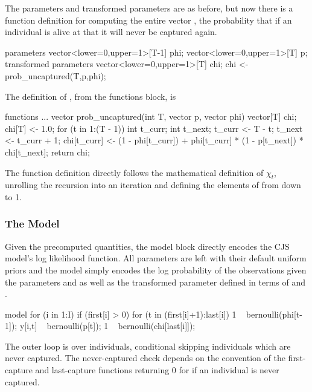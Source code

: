The parameters and transformed parameters are as before, but now there
is a function definition for computing the entire vector , the
probability that if an individual is alive at  that it will
never be captured again.
%
\begin{stancode}
parameters {
  vector<lower=0,upper=1>[T-1] phi;
  vector<lower=0,upper=1>[T] p;
}
transformed parameters {
  vector<lower=0,upper=1>[T] chi;
  chi <- prob_uncaptured(T,p,phi);
}
\end{stancode}
%
The definition of , from the functions block,
is
%
\begin{stancode}
functions {
  ...
  vector prob_uncaptured(int T, vector p, vector phi) {
    vector[T] chi;
    chi[T] <- 1.0;              
    for (t in 1:(T - 1)) {
      int t_curr;
      int t_next;
      t_curr <- T - t;
      t_next <- t_curr + 1;
      chi[t_curr] <- (1 - phi[t_curr]) 
                     + phi[t_curr] 
                       * (1 - p[t_next]) 
                       * chi[t_next]; 
    }
    return chi;
  }
}
\end{stancode}
%
The function definition directly follows the mathematical definition
of $\chi_t$, unrolling the recursion into an iteration and
defining the elements of  from  down to 1.

\subsubsection{The Model}

Given the precomputed quantities, the model block directly encodes the
CJS model's log likelihood function.  All parameters are left with
their default uniform priors and the model simply encodes the log
probability of the observations  given the parameters 
and  as well as the transformed parameter  defined
in terms of  and .
%
\begin{stancode}
model {
  for (i in 1:I) {
    if (first[i] > 0) {
      for (t in (first[i]+1):last[i]) {
        1 ~ bernoulli(phi[t-1]);
        y[i,t] ~ bernoulli(p[t]);
      }
      1 ~ bernoulli(chi[last[i]]);
    }
  }
}
\end{stancode}
%
The outer loop is over individuals, conditional skipping individuals
 which are never captured.  The never-captured check depends
on the convention of the first-capture and last-capture functions
returning 0 for  if an individual is never captured.


